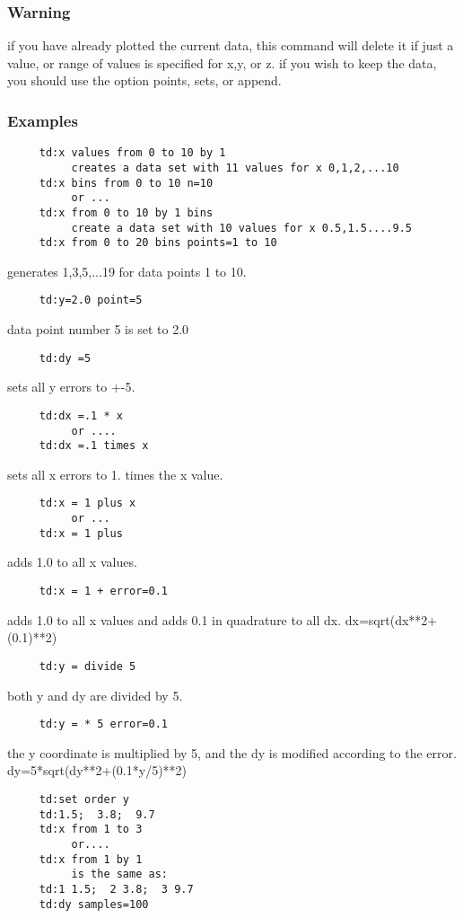 \subsubsection{Warning}
if  you have already plotted the current data, this command will delete
it if just a value, or range of values is specified for x,y, or z.   if
you  wish  to keep the data, you should use the option points, sets, or
append.  
\subsubsection{Examples}
\begin{verbatim}
     td:x values from 0 to 10 by 1 
          creates a data set with 11 values for x 0,1,2,...10 
     td:x bins from 0 to 10 n=10 
          or ...  
     td:x from 0 to 10 by 1 bins 
          create a data set with 10 values for x 0.5,1.5....9.5 
     td:x from 0 to 20 bins points=1 to 10 
\end{verbatim}
generates 1,3,5,...19 for data points 1 to 10.  
\begin{verbatim}
     td:y=2.0 point=5 
\end{verbatim}
data point number 5 is set to 2.0 
\begin{verbatim}
     td:dy =5 
\end{verbatim}
sets all y errors to +-5.  
\begin{verbatim}
     td:dx =.1 * x 
          or ....  
     td:dx =.1 times x 
\end{verbatim}
sets all x errors to 1.  times the x value.  
\begin{verbatim}
     td:x = 1 plus x 
          or ...  
     td:x = 1 plus 
\end{verbatim}
adds 1.0 to all x values.  
\begin{verbatim}
     td:x = 1 + error=0.1 
\end{verbatim}
adds  1.0  to  all  x  values  and  adds  0.1  in quadrature to all dx.
dx=sqrt(dx**2+(0.1)**2) 
\begin{verbatim}
     td:y = divide 5 
\end{verbatim}
both y and dy are divided by 5.  
\begin{verbatim}
     td:y = * 5 error=0.1 
\end{verbatim}
the  y  coordinate is multiplied by 5, and the dy is modified according
to the error.  dy=5*sqrt(dy**2+(0.1*y/5)**2) 
\begin{verbatim}
     td:set order y 
     td:1.5;  3.8;  9.7 
     td:x from 1 to 3 
          or....  
     td:x from 1 by 1 
          is the same as:  
     td:1 1.5;  2 3.8;  3 9.7 
     td:dy samples=100 
\end{verbatim}
